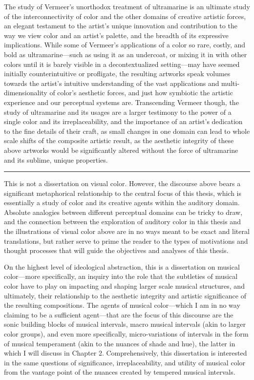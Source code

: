 The study of Vermeer's unorthodox treatment of ultramarine is an
ultimate study of the interconnectivity of color and the other domains
of creative artistic forces, an elegant testament to the artist's unique
innovation and contribution to the way we view color and an artist's
palette, and the breadth of its expressive implications. While some of
Vermeer's applications of a color so rare, costly, and bold as
ultramarine---such as using it as an undercoat, or mixing it in with
other colors until it is barely visible in a decontextualized
setting---may have seemed initially counterintuitive or profligate,
the resulting artworks speak volumes towards the artist's intuitive
understanding of the vast applications and multi-dimensionality of
color's aesthetic forces, and just how symbiotic the artistic experience
and our perceptual systems are. Transcending Vermeer though, the study
of ultramarine and its usages are a larger testimony to the power of a
single color and its irreplaceability, and the importance of an artist's
dedication to the fine details of their craft, as small changes in one
domain can lead to whole scale shifts of the composite artistic result,
as the aesthetic integrity of these above artworks would be
significantly altered without the force of ultramarine and its sublime,
unique properties.
\iftoggle{pretty}{}{\vspace{\baselineskip}}
\par\noindent\hfil\rule{0.5\textwidth}{.4pt}\hfil\par
\iftoggle{pretty}{}{\vspace{\baselineskip}}
    This is not a dissertation on visual color. However, the discourse above
bears a significant metaphorical relationship to the central focus of
this thesis, which is essentially a study of color and its creative
agents within the auditory domain. Absolute analogies between different
perceptual domains can be tricky to draw, and the connection between the
exploration of auditory color in this thesis and the illustrations of
visual color above are in no ways meant to be exact and literal
translations, but rather serve to prime the reader to the types of
motivations and thought processes that will guide the objectives and
analyses of this thesis.

On the highest level of ideological abstraction, this is a dissertation
on musical color---more specifically, an inquiry into the role that
the subtleties of musical color have to play on impacting and shaping
larger scale musical structures, and ultimately, their relationship to
the aesthetic integrity and artistic significance of the resulting
compositions. The agents of musical color---which I am in no way
claiming to be a sufficient agent---that are the focus of this
discourse are the sonic building blocks of musical intervals, macro
musical intervals (akin to larger color groups), and even more
specifically, micro-variations of intervals in the form of musical
temperament (akin to the nuances of shade and hue), the latter in which
I will discuss in Chapter 2. Comprehensively, this dissertation is
interested in the same questions of significance, irreplaceability, and
utility of musical color from the vantage point of the nuances created
by tempered musical intervals.

